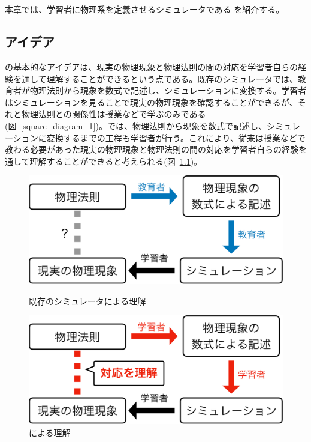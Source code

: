 \chapter{\simname} \label{idea}

本章では、学習者に物理系を定義させるシミュレータである \simname を紹介する。

\section{アイデア}
\simname の基本的なアイデアは、現実の物理現象と物理法則の間の対応を学習者自らの経験を通して理解することができるという点である。既存のシミュレータでは、教育者が物理法則から現象を数式で記述し、シミュレーションに変換する。学習者はシミュレーションを見ることで現実の物理現象を確認することができるが、それと物理法則との関係性は授業などで学ぶのみである(図~\ref{square_diagram_1})。\simname では、物理法則から現象を数式で記述し、シミュレーションに変換するまでの工程も学習者が行う。これにより、従来は授業などで教わる必要があった現実の物理現象と物理法則の間の対応を学習者自らの経験を通して理解することができると考えられる(図~\ref{square_diagram_2})。

\begin{figure}[htb]
  \centering
  \begin{minipage}{0.4\linewidth}
  \includegraphics*[width=\linewidth]{work/square_diagram_1-crop.pdf}
  \caption{既存のシミュレータによる理解} \label{square_diagram_1}
  \end{minipage}
  \quad
  \begin{minipage}{0.4\linewidth}
  \includegraphics*[width=\linewidth]{work/square_diagram_2-crop.pdf}
  \caption{\simname による理解} \label{square_diagram_2}
  \hfill
  \end{minipage}
  \end{figure}

